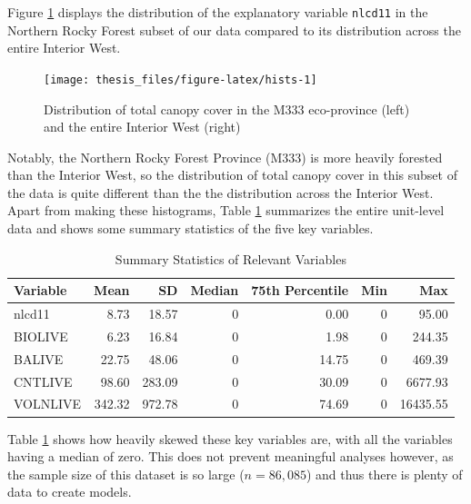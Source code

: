 \documentclass[12pt,twoside]{reedthesis}
\begin{document}
Figure \ref{fig:hists} displays the distribution of the explanatory variable \texttt{nlcd11} in the Northern Rocky Forest subset of our data compared to its distribution across the entire Interior West.
\begin{figure}

{\centering \texttt{[image: thesis\_files/figure-latex/hists-1]} 

}

\caption[Total canopy cover in the M333 eco-province and Interior West]{Distribution of total canopy cover in the M333 eco-province (left) and the entire Interior West (right)}\label{fig:hists}
\end{figure}
Notably, the Northern Rocky Forest Province (M333) is more heavily forested than the Interior West, so the distribution of total canopy cover in this subset of the data is quite different than the the distribution across the Interior West. Apart from making these histograms, Table \ref{tab:var-tab} summarizes the entire unit-level data and shows some summary statistics of the five key variables.
\clearpage
\begin{longtable}[t]{lrrrrrr}
\caption[Summary Statistics of Relevant Variables]{\label{tab:var-tab}Summary Statistics of Relevant Variables}\\
\toprule
Variable & Mean & SD & Median & 75th Percentile & Min & Max\\
\midrule
nlcd11 & 8.73 & 18.57 & 0 & 0.00 & 0 & 95.00\\
BIOLIVE & 6.23 & 16.84 & 0 & 1.98 & 0 & 244.35\\
BALIVE & 22.75 & 48.06 & 0 & 14.75 & 0 & 469.39\\
CNTLIVE & 98.60 & 283.09 & 0 & 30.09 & 0 & 6677.93\\
VOLNLIVE & 342.32 & 972.78 & 0 & 74.69 & 0 & 16435.55\\
\bottomrule
\end{longtable}
Table \ref{tab:var-tab} shows how heavily skewed these key variables are, with all the variables having a median of zero. This does not prevent meaningful analyses however, as the sample size of this dataset is so large (\(n = 86,085\)) and thus there is plenty of data to create models.
\end{document}
